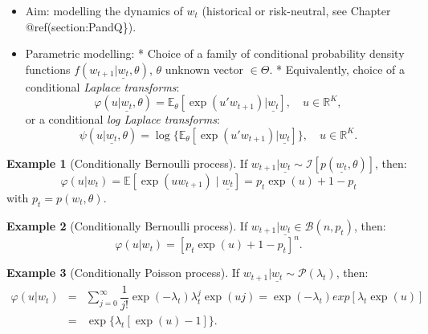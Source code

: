 \documentclass[
  12pt,
]{book}
\providecommand{\tightlist}{%
  \setlength{\itemsep}{0pt}\setlength{\parskip}{0pt}}
\theoremstyle{definition}
\theoremstyle{definition}
\newtheorem{example}{Example}[chapter]
\theoremstyle{definition}
\theoremstyle{definition}
\theoremstyle{remark}
\begin{document}
\begin{itemize}
\tightlist
\item
  Aim: modelling the dynamics of \(w_t\) (historical or risk-neutral, see Chapter @ref(section:PandQ\}).
\item
  Parametric modelling:
  * Choice of a family of conditional probability density functions \(f(w_{t+1}|\underline{w_t},\theta)\), \(\theta\) unknown vector \(\in \Theta\).
  * Equivalently, choice of a conditional \emph{Laplace transforms}:
  \[
  \varphi(u|\underline{w_t},\theta) =
  \mathbb{E}_{\theta}[\exp(u'w_{t+1})|\underline{w_t}], \quad u \in \mathbb{R}^K,
  \]
  or a conditional \emph{log Laplace transforms}:
  \[
  \psi(u|\underline{w_t},\theta) =
  \log\{\mathbb{E}_{\theta}[\exp(u'w_{t+1})|\underline{w_t}]\}, \quad u \in
  \mathbb{R}^K.
  \]
\end{itemize}

\begin{example}[Conditionally Bernoulli process]
\protect\hypertarget{exm:exBenoulli}{}\label{exm:exBenoulli}If \(w_{t+1}|\underline{w_t} \sim {\mathcal{I}} [p(\underline{w_t},\theta)]\), then:
\[
\varphi(u|w_t)=
\mathbb{E}[\exp(u w_{t+1}) \mid \underline{w_t}] = p_t \exp(u) + 1-p_t
\]
with \(p_t = p(w_t, \theta)\).
\end{example}

\begin{example}[Conditionally Bernoulli process]
\protect\hypertarget{exm:exBenoulli2}{}\label{exm:exBenoulli2}If \(w_{t+1}|\underline{w_t} \in {\mathcal{B}}(n, p_t)\), then:
\[
\varphi(u|w_t)=[p_t   \exp(u) + 1-p_t]^n.
\]
\end{example}

\begin{example}[Conditionally Poisson process]
\protect\hypertarget{exm:exPoisson}{}\label{exm:exPoisson}If \(w_{t+1}|\underline{w_t} \sim {\mathcal{P}}(\lambda_t)\), then:
\begin{eqnarray*}
\varphi(u|w_t) & =&   \sum^\infty_{j=0}  \dfrac{1}{j!}  \exp(-\lambda_t) \lambda^j_t   \exp(uj)  = \exp(-\lambda_t) exp[\lambda_t \exp(u)] \\
& =& \exp\{\lambda_t[\exp(u)-1]\}.
\end{eqnarray*}
\end{example}
\end{document}

